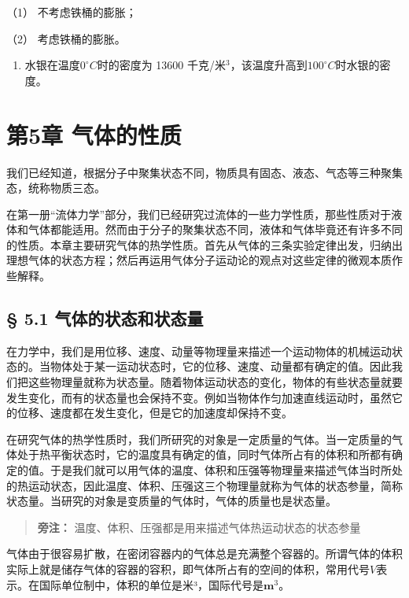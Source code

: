 （1） 不考虑铁桶的膨胀；

（2） 考虑铁桶的膨胀。

\begin{enumerate}
\def\labelenumi{\arabic{enumi}.}
\setcounter{enumi}{12}
\tightlist
\item
  水银在温度\(0^{\circ}C\)时的密度为 13600
  千克/米\(^{3}\)，该温度升高到\(100^{\circ}C\)时水银的密度。
\end{enumerate}

\chapter{第5章
气体的性质}\label{ux7b2c5ux7ae0-ux6c14ux4f53ux7684ux6027ux8d28}

我们已经知道，根据分子中聚集状态不同，物质具有固态、液态、气态等三种聚集态，统称物质三态。

在第一册``流体力学''部分，我们已经研究过流体的一些力学性质，那些性质对于液体和气体都能适用。然而由于分子的聚集状态不同，液体和气体毕竟还有许多不同的性质。本章主要研究气体的热学性质。首先从气体的三条实验定律出发，归纳出理想气体的状态方程；然后再运用气体分子运动论的观点对这些定律的微观本质作些解释。

\section{§ 5.1
气体的状态和状态量}\label{ux6c14ux4f53ux7684ux72b6ux6001ux548cux72b6ux6001ux91cf}

在力学中，我们是用位移、速度、动量等物理量来描述一个运动物体的机械运动状态的。当物体处于某一运动状态时，它的位移、速度、动量都有确定的值。因此我们把这些物理量就称为状态量。随着物体运动状态的变化，物体的有些状态量就要发生变化，而有的状态量也会保持不变。例如当物体作匀加速直线运动时，虽然它的位移、速度都在发生变化，但是它的加速度却保持不变。

在研究气体的热学性质时，我们所研究的对象是一定质量的气体。当一定质量的气体处于热平衡状态时，它的温度具有确定的值，同时气体所占有的体积和所都有确定的值。于是我们就可以用气体的温度、体积和压强等物理量来描述气体当时所处的热运动状态，因此温度、体积、压强这三个物理量就称为气体的状态参量，简称状态量。当研究的对象是变质量的气体时，气体的质量也是状态量。

\begin{quote}
\textbf{旁注：} 温度、体积、压强都是用来描述气体热运动状态的状态参量
\end{quote}

气体由于很容易扩散，在密闭容器内的气体总是充满整个容器的。所谓气体的体积实际上就是储存气体的容器的容积，即气体所占有的空间的体积，常用代号\(V\)表示。在国际单位制中，体积的单位是米³，国际代号是\(\mathbf{m}^3\)。

